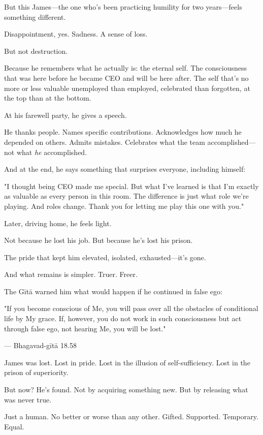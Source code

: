 \documentclass[11pt,twoside]{book}
\begin{document}
But this James—the one who's been practicing humility for two years—feels something different.

Disappointment, yes. Sadness. A sense of loss.

But not destruction.

Because he remembers what he actually is: the eternal self. The consciousness that was here before he became CEO and will be here after. The self that's no more or less valuable unemployed than employed, celebrated than forgotten, at the top than at the bottom.

At his farewell party, he gives a speech.

He thanks people. Names specific contributions. Acknowledges how much he depended on others. Admits mistakes. Celebrates what the team accomplished—not what \emph{he} accomplished.

And at the end, he says something that surprises everyone, including himself:

"I thought being CEO made me special. But what I've learned is that I'm exactly as valuable as every person in this room. The difference is just what role we're playing. And roles change. Thank you for letting me play this one with you."

Later, driving home, he feels light.

Not because he lost his job. But because he's lost his prison.

The pride that kept him elevated, isolated, exhausted—it's gone.

And what remains is simpler. Truer. Freer.

The Gītā warned him what would happen if he continued in false ego:

\begin{pullquote}
"If you become conscious of Me, you will pass over all the obstacles of conditional life by My grace. If, however, you do not work in such consciousness but act through false ego, not hearing Me, you will be lost."

--- Bhagavad-gītā 18.58
\end{pullquote}

James was lost. Lost in pride. Lost in the illusion of self-sufficiency. Lost in the prison of superiority.

But now? He's found. Not by acquiring something new. But by releasing what was never true.

Just a human. No better or worse than any other. Gifted. Supported. Temporary. Equal.
\end{document}
